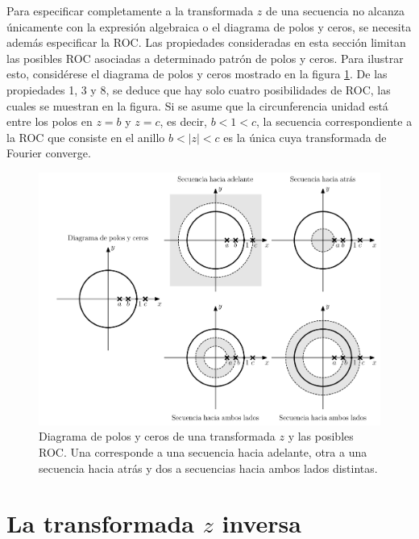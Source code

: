 \documentclass[a4paper]{report}
\begin{document}
Para especificar completamente a la transformada \(z\) de una secuencia no alcanza únicamente con la expresión algebraica o el diagrama de polos y ceros, se necesita además especificar la ROC. Las propiedades consideradas en esta sección limitan las posibles ROC asociadas a determinado patrón de polos y ceros. Para ilustrar esto, considérese el diagrama de polos y ceros mostrado en la figura \ref{fig:z_transform_roc_posibilities}. De las propiedades 1, 3 y 8, se deduce que hay solo cuatro posibilidades de ROC, las cuales se muestran en la figura. Si se asume que la circunferencia unidad está entre los polos en \(z=b\) y \(z=c\), es decir, \(b<1<c\), la secuencia correspondiente a la ROC que consiste en el anillo \(b<|z|<c\) es la única cuya transformada de Fourier converge.
\begin{figure}[!htb]
 \begin{center}
 \includegraphics[width=1\textwidth]{figuras/z_transform_roc_posibilities.pdf}
 \caption{\label{fig:z_transform_roc_posibilities} Diagrama de polos y ceros de una transformada \(z\) y las posibles ROC. Una corresponde a una secuencia hacia adelante, otra a una secuencia hacia atrás y dos a secuencias hacia ambos lados distintas.}
 \end{center}
\end{figure}

\section{La transformada \texorpdfstring{\(z\)}{z} inversa} 
 
\end{document}
